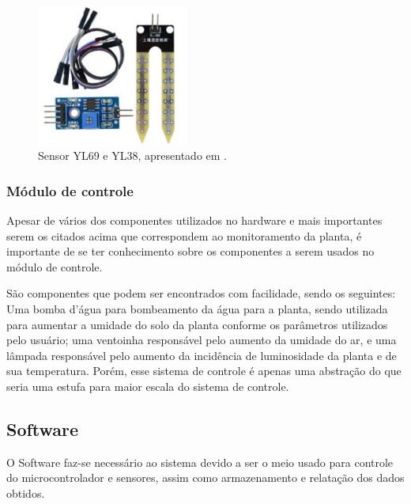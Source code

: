 \documentclass[conference]{IEEEtran}
\begin{document}
\begin{figure}
    \centering
    \includegraphics[width=5cm]{yl69.png}
    \caption{Sensor YL69 e YL38, apresentado em \cite{b27}.}
    \label{fig:yl69}
\end{figure}

\subsubsection{Módulo de controle}
Apesar de vários dos componentes utilizados no hardware e mais importantes serem os citados acima que correspondem ao monitoramento da planta, é importante de se ter conhecimento sobre os componentes a serem usados no módulo de controle. 

São componentes que podem ser encontrados com facilidade, sendo os seguintes: Uma bomba d'água para bombeamento da água para a planta, sendo utilizada para aumentar a umidade do solo da planta conforme os parâmetros utilizados pelo usuário; uma ventoinha responsável pelo aumento da umidade do ar, e uma lâmpada responsável pelo aumento da incidência de luminosidade da planta e de sua temperatura. Porém, esse sistema de controle é apenas uma abstração do que seria uma estufa para maior escala do sistema de controle.

\subsection{Software}
O Software faz-se necessário ao sistema devido a ser o meio usado para controle do microcontrolador e sensores, assim como armazenamento e relatação dos dados obtidos.
\end{document}
